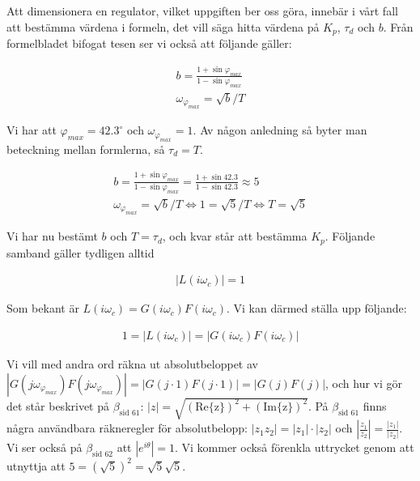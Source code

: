 \documentclass[a4paper]{article}
\newcommand{\mhb}[1]{$\beta_{\text{#1}}$}     %
\newcommand{\oklarhet}[1]{%
  \noindent\fbox{\parbox[b][2em][t]{\textwidth}{\color{red}#1} }%
}
\begin{document}
Att dimensionera en regulator, vilket uppgiften ber oss göra, innebär i vårt fall att bestämma värdena i formeln, det vill säga hitta värdena på $K_p$, $\tau_d$ och $b$. Från formelbladet bifogat tesen ser vi också att följande gäller:

\begin{align*}
  b = \frac{1 + \sin \varphi_{max}}{1 - \sin \varphi_{max}}\\
  \omega_{\varphi_{max}} = \sqrt{b}/T
\end{align*}

Vi har att $\varphi_{max} = 42.3^\circ$ och $\omega_{\varphi_{max}} = 1$. Av någon anledning så byter man beteckning mellan formlerna, så $\tau_d = T$.\\
\oklarhet{Varför är $T = \tau_d$?}

\begin{align*}
  b = \frac{1 + \sin \varphi_{max}}{1 - \sin \varphi_{max}} = \frac{1 + \sin 42.3}{1 - \sin 42.3} \approx 5\\
  \omega_{\varphi_{max}} = \sqrt{b}/T \Longleftrightarrow 1 = \sqrt{5}/T \Longleftrightarrow T = \sqrt{5}
\end{align*}

Vi har nu bestämt $b$ och $T = \tau_d$, och kvar står att bestämma $K_p$. Följande samband gäller tydligen alltid\\
\oklarhet{Referens?}

\begin{align*}
  |L(i\omega_c)| = 1
\end{align*}

Som bekant är $L(i\omega_c) = G(i\omega_c)F(i\omega_c)$. Vi kan därmed ställa upp följande:

\begin{align*}
  1 = |L(i\omega_c)| = |G(i\omega_c)F(i\omega_c)|
\end{align*}

Vi vill med andra ord räkna ut absolutbeloppet av $|G(j\omega_{\varphi_{max}})F(j\omega_{\varphi_{max}})| = |G(j\cdot1)F(j\cdot1)| = |G(j)F(j)|$, och hur vi gör det står beskrivet på \mhb{sid 61}: $|z| = \sqrt{(\text{Re\{z\}})^2 + (\text{Im\{z\}})^2}$. På \mhb{sid 61} finns några användbara räkneregler för absolutbelopp: $|z_1 z_2| = |z_1|\cdot |z_2|$ och $\left|\frac{z_1}{z_2}\right| = \frac{|z_1|}{|z_2|}$. Vi ser också på \mhb{sid 62} att $|e^{i\theta}| = 1$. Vi kommer också förenkla uttrycket genom att utnyttja att $5 = (\sqrt{5})^2 = \sqrt{5}\sqrt{5}$.
\end{document}
